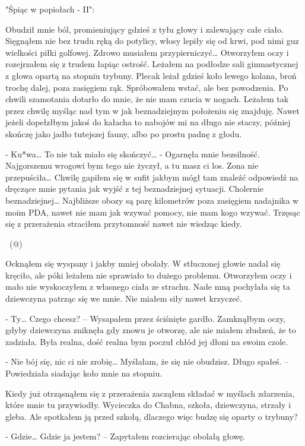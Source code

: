 \documentclass[../MAIN.tex]{subfiles}
\begin{document}
"Śpiąc w popiołach - II":  

Obudził mnie ból, promieniujący gdzieś z tyłu głowy i zalewający całe ciało. Sięgnąłem nie bez trudu ręką do potylicy, włosy lepiły się od krwi, pod nimi guz wielkości piłki golfowej. Zdrowo musiałem przypierniczyć… Otworzyłem oczy i rozejrzałem się z trudem łapiąc ostrość. Leżałem na podłodze sali gimnastycznej z głowa opartą na stopniu trybuny. Plecak leżał gdzieś koło lewego kolana, broń trochę dalej, poza zasięgiem rąk. Spróbowałem wstać, ale bez powodzenia. Po chwili szamotania dotarło do mnie, że nie mam czucia w nogach. Leżałem tak przez chwilę myśląc nad tym w jak beznadziejnym położeniu się znajduję. Nawet jeżeli dopełzłbym jakoś do kałacha to nabojów mi na długo nie staczy, później skończę jako jadło tutejszej fauny, albo po prostu padnę z głodu.

- Ku*wa… To nie tak miało się skończyć… - Ogarnęła mnie bezsilność. Najgorszemu wrogowi bym tego nie życzył, a tu masz ci los. Zona nie przepuściła… Chwilę gapiłem się w sufit jakbym mógł tam znaleźć odpowiedź na dręczące mnie pytania jak wyjść z tej beznadziejnej sytuacji. Cholernie beznadziejnej… Najbliższe obozy są parę kilometrów poza zasięgiem nadajnika w moim PDA, nawet nie mam jak wzywać pomocy, nie mam kogo wzywać. Trzęsąc się z przerażenia straciłem przytomność nawet nie wiedząc kiedy.

~(@)~

Ocknąłem się wyspany i jakby mniej obolały. W stłuczonej głowie nadal się kręciło, ale póki leżałem nie sprawiało to dużego problemu. Otworzyłem oczy i mało nie wyskoczyłem z własnego ciała ze strachu. Nade mną pochylała się ta dziewczyna patrząc się we mnie. Nie miałem siły nawet krzyczeć.

- Ty… Czego chcesz? – Wysapałem przez ściśnięte gardło. Zamknąłbym oczy, gdyby dziewczyna zniknęła gdy znowu je otworzę, ale nie miałem złudzeń, że to zadziała. Była realna, dość realna bym poczuł chłód jej dłoni na swoim czole.

- Nie bój się, nic ci nie zrobię… Myślałam, że się nie obudzisz. Długo spałeś. – Powiedziała siadając koło mnie na stopniu.

Kiedy już otrząsnąłem się z przerażenia zacząłem składać w myślach zdarzenia, które mnie tu przywiodły. Wycieczka do Chabna, szkoła, dziewczyna, strzały i gleba. Ale spotkałem ją przed szkołą, dlaczego więc budzę się oparty o trybuny?

- Gdzie… Gdzie ja jestem? – Zapytałem rozcierając obolałą głowę.
\end{document}
